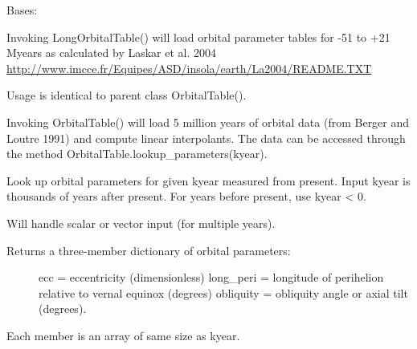 \documentclass[letterpaper,10pt,english]{sphinxmanual}
\begin{document}
\begin{fulllineitems}
\label{api/climlab.solar:climlab.solar.orbital.LongOrbitalTable}
Bases: {\hyperref[api/climlab.solar:climlab.solar.orbital.OrbitalTable]{\emph{}}}

Invoking LongOrbitalTable() will load orbital parameter tables for -51 to +21 Myears
as calculated by Laskar et al. 2004
\href{http://www.imcce.fr/Equipes/ASD/insola/earth/La2004/README.TXT}{http://www.imcce.fr/Equipes/ASD/insola/earth/La2004/README.TXT}

Usage is identical to parent class OrbitalTable().

\end{fulllineitems}


\begin{fulllineitems}
\label{api/climlab.solar:climlab.solar.orbital.OrbitalTable}
Invoking OrbitalTable() will load 5 million years of orbital data
(from Berger and Loutre 1991) and compute linear interpolants.
The data can be accessed through the method 
OrbitalTable.lookup\_parameters(kyear).

\begin{fulllineitems}
\label{api/climlab.solar:climlab.solar.orbital.OrbitalTable.lookup_parameters}
Look up orbital parameters for given kyear measured from present.
Input kyear is thousands of years after present.
For years before present, use kyear \textless{} 0.

Will handle scalar or vector input (for multiple years).
\begin{description}
\item[{Returns a three-member dictionary of orbital parameters: }] \leavevmode
ecc = eccentricity (dimensionless)
long\_peri = longitude of perihelion relative to vernal equinox (degrees)
obliquity = obliquity angle or axial tilt (degrees).

\end{description}

Each member is an array of same size as kyear.

\end{fulllineitems}


\end{fulllineitems}
\end{document}
